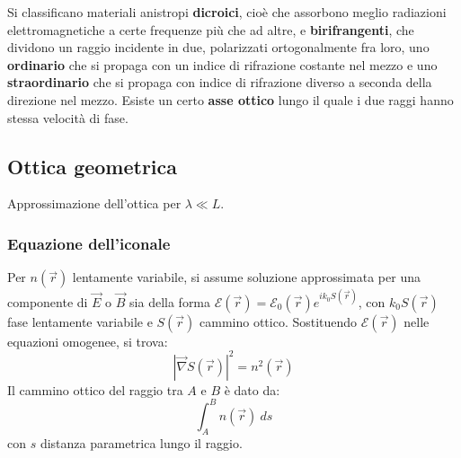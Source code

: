 \documentclass[10pt, a4paper]{scrartcl}
\numberwithin{equation}{subsection}
\theoremstyle{style1}
\begin{document}
Si classificano materiali anistropi \textbf{dicroici}, cio\`e che assorbono meglio radiazioni elettromagnetiche a certe frequenze pi\`u che ad altre, e \textbf{birifrangenti}, che dividono un raggio incidente in due, polarizzati ortogonalmente fra loro, uno \textbf{ordinario} che si propaga con un indice di rifrazione costante nel mezzo e uno \textbf{straordinario} che si propaga con indice di rifrazione diverso a seconda della direzione nel mezzo. Esiste un certo \textbf{asse ottico} lungo il quale i due raggi hanno stessa velocit\`a di fase.

\subsection{Ottica geometrica}
Approssimazione dell'ottica per $\lambda \ll L$.
\subsubsection{Equazione dell'iconale}
Per $n(\vec{r})$ lentamente variabile, si assume soluzione approssimata per una componente di $\vec{E}$ o $\vec{B}$ sia della forma $\mathcal{E} (\vec{r}) = \mathcal{E}_0 (\vec{r}) e^{i k_0S(\vec{r})} $, con $k_0S(\vec{r})$ fase lentamente variabile e $S(\vec{r})$ cammino ottico. Sostituendo $\mathcal{E}(\vec{r})$ nelle equazioni omogenee, si trova:
\begin{equation}
	\left\lvert \vec{\nabla }S(\vec{r}) \right\rvert ^2 = n^2 (\vec{r})	
\end{equation}
Il cammino ottico del raggio tra $A$ e $B$ \`e dato da:
\begin{equation}
	\int_{A} ^B n(\vec{r}) \ ds
\end{equation}
con $s$ distanza parametrica lungo il raggio. 
\end{document}
